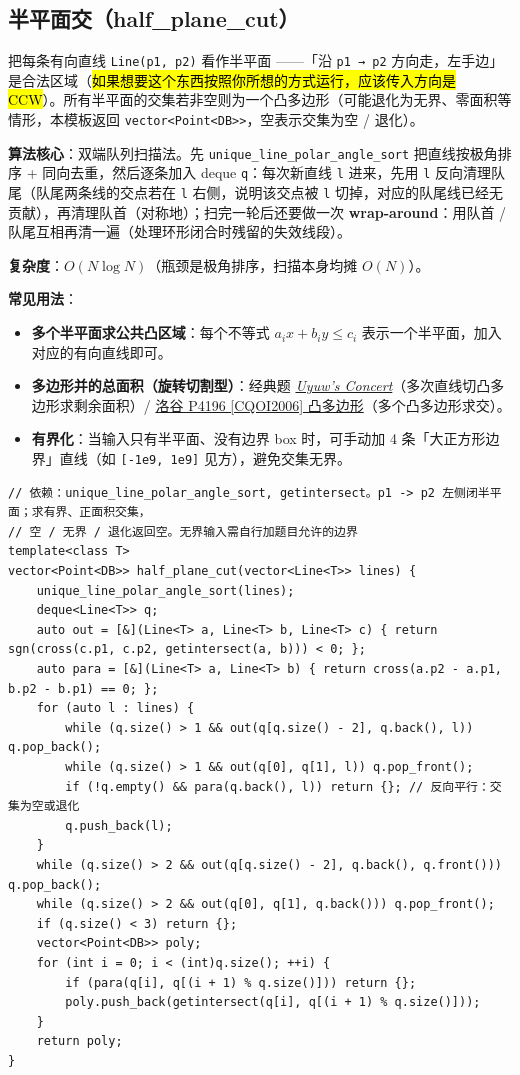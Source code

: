 		\subsection[\tochl{半平面交（half\_plane\_cut）}]{半平面交（half\_plane\_cut）}

		把每条有向直线 \texttt{Line(p1, p2)} 看作半平面 ——「沿 \texttt{p1 → p2} 方向走，左手边」是合法区域（\hl{如果想要这个东西按照你所想的方式运行，应该传入方向是 CCW}）。所有半平面的交集若非空则为一个凸多边形（可能退化为无界、零面积等情形，本模板返回 \texttt{vector<Point<DB>>}，空表示交集为空 / 退化）。

		\textbf{算法核心}：双端队列扫描法。先 \texttt{unique\_line\_polar\_angle\_sort} 把直线按极角排序 + 同向去重，然后逐条加入 deque \texttt{q}：每次新直线 \texttt{l} 进来，先用 \texttt{l} 反向清理队尾（队尾两条线的交点若在 \texttt{l} 右侧，说明该交点被 \texttt{l} 切掉，对应的队尾线已经无贡献），再清理队首（对称地）；扫完一轮后还要做一次 \textbf{wrap-around}：用队首 / 队尾互相再清一遍（处理环形闭合时残留的失效线段）。

		\textbf{复杂度}：$O(N \log N)$（瓶颈是极角排序，扫描本身均摊 $O(N)$）。

		\textbf{常见用法}：
		\begin{itemize}
			\item \textbf{多个半平面求公共凸区域}：每个不等式 $a_i x + b_i y \le c_i$ 表示一个半平面，加入对应的有向直线即可。
			\item \textbf{多边形并的总面积（旋转切割型）}：经典题 \href{https://vjudge.net/problem/OpenJ_Bailian-2451}{\emph{Uyuw's Concert}}（多次直线切凸多边形求剩余面积）/ \href{https://www.luogu.com.cn/problem/P4196}{洛谷 P4196 [CQOI2006] 凸多边形}（多个凸多边形求交）。
			\item \textbf{有界化}：当输入只有半平面、没有边界 box 时，可手动加 4 条「大正方形边界」直线（如 \texttt{[-1e9, 1e9]} 见方），避免交集无界。
		\end{itemize}

\begin{verbatim}
// 依赖：unique_line_polar_angle_sort, getintersect。p1 -> p2 左侧闭半平面；求有界、正面积交集，
// 空 / 无界 / 退化返回空。无界输入需自行加题目允许的边界
template<class T>
vector<Point<DB>> half_plane_cut(vector<Line<T>> lines) {
	unique_line_polar_angle_sort(lines);
	deque<Line<T>> q;
	auto out = [&](Line<T> a, Line<T> b, Line<T> c) { return sgn(cross(c.p1, c.p2, getintersect(a, b))) < 0; };
	auto para = [&](Line<T> a, Line<T> b) { return cross(a.p2 - a.p1, b.p2 - b.p1) == 0; };
	for (auto l : lines) {
		while (q.size() > 1 && out(q[q.size() - 2], q.back(), l)) q.pop_back();
		while (q.size() > 1 && out(q[0], q[1], l)) q.pop_front();
		if (!q.empty() && para(q.back(), l)) return {}; // 反向平行：交集为空或退化
		q.push_back(l);
	}
	while (q.size() > 2 && out(q[q.size() - 2], q.back(), q.front())) q.pop_back();
	while (q.size() > 2 && out(q[0], q[1], q.back())) q.pop_front();
	if (q.size() < 3) return {};
	vector<Point<DB>> poly;
	for (int i = 0; i < (int)q.size(); ++i) {
		if (para(q[i], q[(i + 1) % q.size()])) return {};
		poly.push_back(getintersect(q[i], q[(i + 1) % q.size()]));
	}
	return poly;
}
\end{verbatim}

